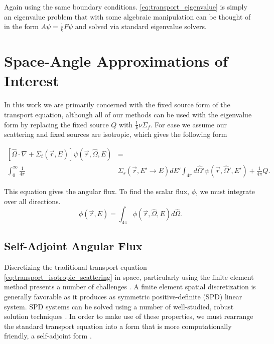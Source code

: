 Again using the same boundary conditions. \eqref{eq:transport_eigenvalue} is simply an eigenvalue problem that with some algebraic manipulation can be thought of in the form $A\psi = \frac{1}{k} F\psi$ and solved via standard eigenvalue solvers. 

\section{Space-Angle Approximations of Interest}
In this work we are primarily concerned with the fixed source form of the transport equation, although all of our methods can be used with the eigenvalue form by replacing the fixed source $Q$ with $\frac{1}{k}\nu\Sigma_f$. For ease we assume our scattering and fixed sources are isotropic, which gives the following form

\begin{equation}
\begin{split}
 [\hat{\Omega} \cdot \nabla + \Sigma_t(\vec{r}, E)]\psi(\vec{r}, \hat{\Omega}, E) &= \\  \int_0^\infty \frac{1}{4\pi} &\Sigma_s(\vec{r}, E' \rightarrow E)  dE' \int_{4\pi} d\hat{\Omega}'\psi(\vec{r}, \hat{\Omega}', E')  + \frac{1}{4\pi}Q.
\end{split}
 \label{eq:transport_isotropic_scattering}
\end{equation}


This equation gives the angular flux. To find the scalar flux, $\phi$, we must integrate over all directions.
\begin{equation}
    \phi(\vec{r}, E) = \int_{4\pi} \phi(\vec{r}, \hat{\Omega}, E) d \hat{\Omega}.
\end{equation}

\subsection{Self-Adjoint Angular Flux}
Discretizing the traditional transport equation \eqref{eq:transport_isotropic_scattering} in space, particularly using the finite element method presents a number of challenges \cite{saaf}. A finite element spatial discretization is generally favorable as it produces as symmetric positive-definite (SPD) linear system. SPD systems can be solved using a number of well-studied, robust solution techniques \cite{Shewchuck1994}. In order to make use of these properties, we must rearrange the standard transport equation into a form that is more computationally friendly, a self-adjoint form \cite{saaf}.



